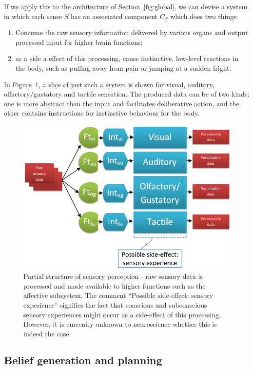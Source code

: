 If we apply this to the architecture of Section~\ref{fig:global}, we can devise a system in which each sense $S$ has an associated component $C_S$ which does two things:
\begin{enumerate}
	\item Consume the raw sensory information delivered by various organs and output processed input for higher brain functions;
	\item as a side a effect of this processing, cause  instinctive, low-level reactions in the body, such as pulling away from pain or jumping at a sudden fright.
\end{enumerate}

In Figure~\ref{fig:sensoryPerception}, a slice of just such a system is shown for visual, auditory, olfactory/gustatory and tactile sensation. The produced data can be of two kinds: one is more abstract than the input and facilitates deliberative action, and the other contains instructions for instinctive behaviour for the body.

\begin{figure}[!h]
	\centering
	\includegraphics[width=325pt]{figs/sensoryPerception.png}
	\caption{Partial structure of sensory perception - raw sensory data is processed and made available to higher functions such as the affective subsystem. The comment ``Possible side-effect: sensory experience'' signifies the fact that conscious and subconscious sensory experiences might occur as a side-effect of this processing. However, it is currently unknown to neuroscience whether this is indeed the case.}
	\label{fig:sensoryPerception}
\end{figure}


\subsection{Belief generation and planning}\label{sec:worldSimulation}

